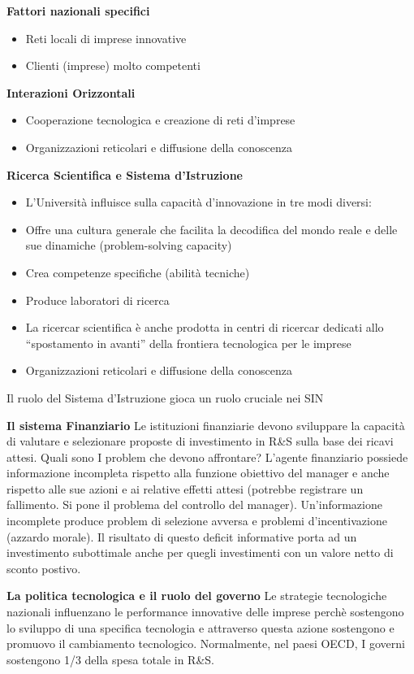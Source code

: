 \documentclass{article}
\begin{document}
\textbf{Fattori nazionali specifici}
\begin{itemize}
	\item Reti locali di imprese innovative
	\item Clienti (imprese) molto competenti
\end{itemize}

\textbf{Interazioni Orizzontali}
\begin{itemize}
	\item Cooperazione tecnologica e creazione di reti d’imprese
	\item  Organizzazioni reticolari e diffusione della conoscenza
\end{itemize}


\textbf{Ricerca Scientifica  e Sistema d'Istruzione }
\begin{itemize}
	\item L’Università influisce sulla capacità d’innovazione in tre modi diversi:
	
	\item Offre una cultura generale che facilita la decodifica del mondo
	reale e delle sue dinamiche (problem-solving capacity)
	\item Crea competenze specifiche (abilità tecniche)
	\item Produce laboratori di ricerca
	\item La ricercar scientifica è anche prodotta in centri di ricercar
	dedicati allo “spostamento in avanti” della frontiera tecnologica
	per le imprese
	\item  Organizzazioni reticolari e diffusione della conoscenza
\end{itemize}
Il ruolo del Sistema d’Istruzione gioca un ruolo cruciale nei SIN

\textbf{Il sistema Finanziario}
Le istituzioni finanziarie devono sviluppare la capacità di valutare e selezionare
proposte di investimento in R\&S sulla base dei ricavi attesi. Quali sono I
problem che devono affrontare?
L’agente finanziario possiede informazione incompleta rispetto alla funzione
obiettivo del manager e anche rispetto alle sue azioni e ai relative effetti attesi
(potrebbe registrare un fallimento. Si pone il problema del controllo del
manager).
Un’informazione incomplete produce problem di selezione avversa e problemi
d’incentivazione (azzardo morale). Il risultato di questo deficit informative porta
ad un investimento subottimale anche per quegli investimenti con un valore
netto di sconto postivo.

\textbf{La politica tecnologica e il ruolo del governo}
Le strategie tecnologiche
nazionali influenzano le
performance innovative delle
imprese perchè sostengono lo
sviluppo di una specifica
tecnologia e attraverso questa
azione sostengono e promuovo il
cambiamento tecnologico.
Normalmente, nel paesi OECD, I
governi sostengono 1/3 della
spesa totale in R\&S.
\end{document}
